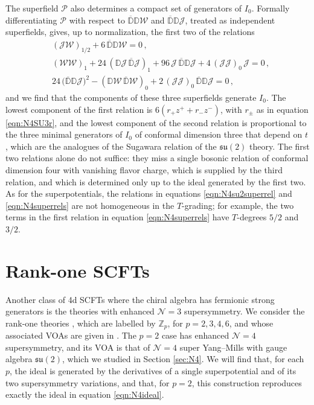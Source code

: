 \documentclass[12pt]{article}
\numberwithin{equation}{section}
\numberwithin{figure}{section}
\theoremstyle{plain}
\theoremstyle{definition}
\begin{document}
The superfield $\mathcal{P}$ also determines a compact set of generators of $I_0$. Formally differentiating $\mathcal{P}$ with respect to $\overline{\mathbb{D}}\mathbb{D}\mathcal{W}$ and $\overline{\mathbb{D}}\mathbb{D}\mathcal{J}$, treated as independent superfields, gives, up to normalization, the first two of the relations
\begin{equation}\label{eqn:N4superrels}
  \begin{aligned}
    & (\mathcal{J}\mathcal{W})_{1/2} + 6 \, \overline{\mathbb{D}}\mathbb{D}\mathcal{W} = 0 \,, \\
    & (\mathcal{W}\mathcal{W})_1 + 24 \, (\mathbb{D}\mathcal{J} \, \overline{\mathbb{D}}\mathcal{J})_1 + 96 \, \mathcal{J} \, \overline{\mathbb{D}}\mathbb{D}\mathcal{J} + 4 \, (\mathcal{J}\mathcal{J})_0 \, \mathcal{J} = 0 \,, \\
    & 24 \, \big( \overline{\mathbb{D}}\mathbb{D}\mathcal{J} \big)^2 - (\mathbb{D}\mathcal{W} \, \overline{\mathbb{D}}\mathcal{W})_0 + 2 \, (\mathcal{J}\mathcal{J})_0 \, \overline{\mathbb{D}}\mathbb{D}\mathcal{J} = 0 \,,
  \end{aligned}
\end{equation}
and we find that the components of these three superfields generate $I_0$. The lowest component of the first relation is $6(r_+ z^+ + r_- z^-)$, with $r_\pm$ as in equation \eqref{eqn:N4SU3r}, and the lowest component of the second relation is proportional to the three minimal generators of $I_0$ of conformal dimension three that depend on $t$, which are the analogues of the Sugawara relation of the $\mathfrak{su}(2)$ theory. The first two relations alone do not suffice: they miss a single bosonic relation of conformal dimension four with vanishing flavor charge, which is supplied by the third relation, and which is determined only up to the ideal generated by the first two. As for the superpotentials, the relations in equations \eqref{eqn:N4su2superrel} and \eqref{eqn:N4superrels} are not homogeneous in the $T$-grading; for example, the two terms in the first relation in equation \eqref{eqn:N4superrels} have $T$-degrees $5/2$ and $3/2$.

\section{Rank-one \texorpdfstring{}{N=3} SCFTs}\label{sec:N3}

Another class of 4d SCFTs where the chiral algebra has fermionic strong generators is the theories with enhanced $\mathcal{N}=3$ supersymmetry. We consider the rank-one theories \cite{Garcia-Etxebarria:2015wns,Nishinaka:2016hbw,Aharony:2016kai}, which are labelled by $\mathbb{Z}_p$, for $p = 2, 3, 4, 6$, and whose associated VOAs are given in \cite{Nishinaka:2016hbw,Bonetti:2018fqz}. The $p = 2$ case has enhanced $\mathcal{N}=4$ supersymmetry, and its VOA is that of $\mathcal{N}=4$ super Yang--Mills with gauge algebra $\mathfrak{su}(2)$, which we studied in Section \ref{sec:N4}. We will find that, for each $p$, the ideal is generated by the derivatives of a single superpotential and of its two supersymmetry variations, and that, for $p = 2$, this construction reproduces exactly the ideal in equation \eqref{eqn:N4ideal}.
\end{document}
